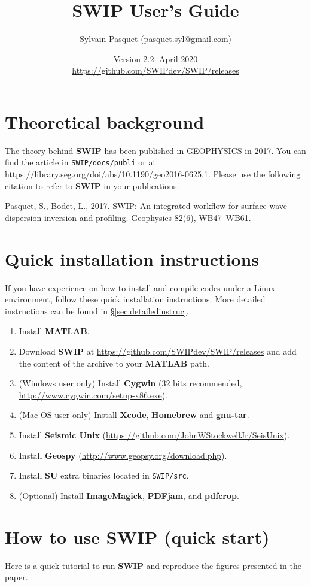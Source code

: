 \documentclass[twoside,a4paper]{article}
\title{\vspace{5cm}\Huge{\textbf{SWIP User's Guide}}}
\author{\Large{Sylvain Pasquet} (\url{pasquet.syl@gmail.com})}
\date{\LARGE{Version 2.2: April 2020}\\[2ex]
\large\url{https://github.com/SWIPdev/SWIP/releases}}
\def\SWIP{\textbf{SWIP}}
\def\SU{\textbf{SU}}
\def\SeismicUnix{\textbf{Seismic Unix}}
\def\Geopsy{\textbf{Geospy}}
\def\ImageMagick{\textbf{ImageMagick}}
\def\PDFjam{\textbf{PDFjam}}
\def\pdfcrop{\textbf{pdfcrop}}
\def\MATLAB{\textbf{MATLAB}}
\def\Cygwin{\textbf{Cygwin}}
\begin{document}
\maketitle
\thispagestyle{empty}
\newpage
\tableofcontents

\newpage
\section{Theoretical background}
The theory behind {\SWIP} has been published in GEOPHYSICS in 2017. You can find the article in \verb|SWIP/docs/publi| or at \url{https://library.seg.org/doi/abs/10.1190/geo2016-0625.1}. Please use the following citation to refer to {\SWIP} in your publications:

Pasquet, S., Bodet, L., 2017. SWIP: An integrated workflow for surface-wave dispersion inversion and profiling. Geophysics 82(6), WB47–WB61.

\section{Quick installation instructions}
If you have experience on how to install and compile codes under a Linux environment, follow these quick installation instructions. More detailed instructions can be found in §\ref{sec:detailedinstruc}.
\begin{enumerate}[leftmargin=*]
\setlength\itemsep{2ex}
\item Install {\MATLAB}.
\item Download {\SWIP} at \url{https://github.com/SWIPdev/SWIP/releases} and add the content of the archive to your {\MATLAB} path.
\item (Windows user only) Install {\Cygwin} (32 bits recommended, \url{http://www.cygwin.com/setup-x86.exe}).
\item (Mac OS user only) Install \textbf{Xcode}, \textbf{Homebrew} and \textbf{gnu-tar}.
\item Install {\SeismicUnix} (\url{https://github.com/JohnWStockwellJr/SeisUnix}).
\item Install {\Geopsy} (\url{http://www.geopsy.org/download.php}).
\item Install {\SU} extra binaries located in \verb|SWIP/src|.
\item (Optional) Install {\ImageMagick}, {\PDFjam}, and {\pdfcrop}.
\end{enumerate}

\section{How to use SWIP (quick start)}
Here is a quick tutorial to run {\SWIP} and reproduce the figures presented in the paper.
\end{document}
